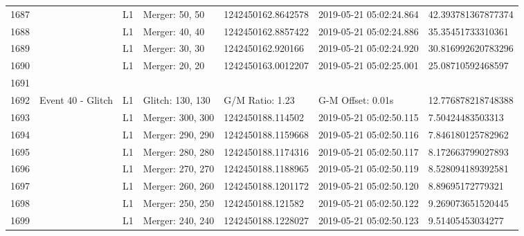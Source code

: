 \begin{longtable}{lllllll}
1687 &                                                    &       L1 &    Merger: 50, 50 &  1242450162.8642578 &  2019-05-21 05:02:24.864 &  42.393781367877374 \\
1688 &                                                    &       L1 &    Merger: 40, 40 &  1242450162.8857422 &  2019-05-21 05:02:24.886 &   35.35451733310361 \\
1689 &                                                    &       L1 &    Merger: 30, 30 &   1242450162.920166 &  2019-05-21 05:02:24.920 &  30.816992620783296 \\
1690 &                                                    &       L1 &    Merger: 20, 20 &  1242450163.0012207 &  2019-05-21 05:02:25.001 &   25.08710592468597 \\
1691 &                                                    &          &                   &                     &                          &                     \\
1692 &                                  Event 40 - Glitch &       L1 &  Glitch: 130, 130 &     G/M Ratio: 1.23 &        G-M Offset: 0.01s &  12.776878218748388 \\
1693 &                                                    &       L1 &  Merger: 300, 300 &   1242450188.114502 &  2019-05-21 05:02:50.115 &    7.50424483503313 \\
1694 &                                                    &       L1 &  Merger: 290, 290 &  1242450188.1159668 &  2019-05-21 05:02:50.116 &   7.846180125782962 \\
1695 &                                                    &       L1 &  Merger: 280, 280 &  1242450188.1174316 &  2019-05-21 05:02:50.117 &   8.172663799027893 \\
1696 &                                                    &       L1 &  Merger: 270, 270 &  1242450188.1188965 &  2019-05-21 05:02:50.119 &   8.528094189392581 \\
1697 &                                                    &       L1 &  Merger: 260, 260 &  1242450188.1201172 &  2019-05-21 05:02:50.120 &    8.89695172779321 \\
1698 &                                                    &       L1 &  Merger: 250, 250 &   1242450188.121582 &  2019-05-21 05:02:50.122 &   9.269073651520445 \\
1699 &                                                    &       L1 &  Merger: 240, 240 &  1242450188.1228027 &  2019-05-21 05:02:50.123 &    9.51405453034277 \\

\end{longtable}

